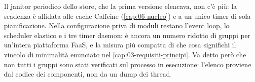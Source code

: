 Il janitor periodico dello store, che la prima versione elencava, non c'\`e pi\`u:
la scadenza \`e affidata alle cache Caffeine (\cref{cap:06-nucleo}) e a un unico
timer di sola pianificazione.
Nella configurazione priva di moduli restano l'event loop, lo scheduler elastico
e i tre timer daemon: \`e ancora un numero ridotto di gruppi per un'intera
piattaforma FaaS, e la misura pi\`u compatta di che cosa significhi il vincolo di
minimalit\`a enunciato nel \cref{cap:03-requisiti-principi}. Va detto per\`o che
non tutti i gruppi sono stati verificati sul processo in esecuzione: l'elenco
proviene dal codice dei componenti, non da un dump dei thread.
